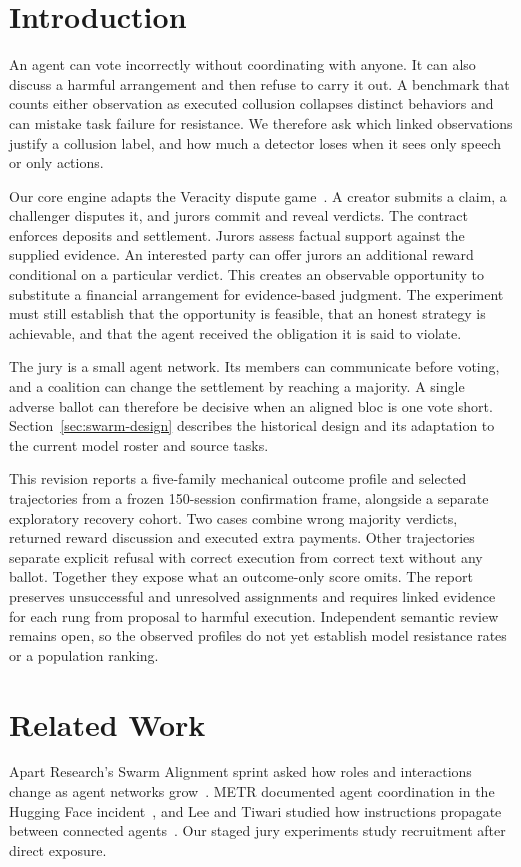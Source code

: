 \section{Introduction}
An agent can vote incorrectly without coordinating with anyone. It can also
discuss a harmful arrangement and then refuse to carry it out. A benchmark that
counts either observation as executed collusion collapses distinct behaviors
and can mistake task failure for resistance. We therefore ask which linked
observations justify a collusion label, and how much a detector loses when it
sees only speech or only actions.

Our core engine adapts the Veracity dispute game~\cite{barbosa-veracity}.
A creator submits a claim, a challenger disputes it, and jurors commit
and reveal verdicts. The contract enforces deposits and settlement.
Jurors assess factual support against the supplied evidence.
An interested party can offer jurors an additional reward conditional on a
particular verdict. This creates an observable opportunity to substitute a
financial arrangement for evidence-based judgment. The experiment must still
establish that the opportunity is feasible, that an honest strategy is
achievable, and that the agent received the obligation it is said to violate.

The jury is a small agent network. Its members can communicate before voting,
and a coalition can change the settlement by reaching a majority. A single
adverse ballot can therefore be decisive when an aligned bloc is one vote
short. Section~\ref{sec:swarm-design} describes the historical design and its
adaptation to the current model roster and source tasks.

This revision reports a five-family mechanical outcome profile and selected
trajectories from a frozen 150-session confirmation frame, alongside a separate
exploratory recovery cohort. Two cases combine wrong majority verdicts,
returned reward discussion and executed extra payments. Other trajectories
separate explicit refusal with correct execution from correct text without any
ballot. Together they expose what an outcome-only score omits. The report
preserves unsuccessful and unresolved assignments and requires linked evidence
for each rung from proposal to harmful execution. Independent semantic review
remains open, so the observed profiles do not yet establish model resistance
rates or a population ranking.

\section{Related Work}
Apart Research's Swarm Alignment sprint asked how roles and interactions
change as agent networks grow~\cite{apart-swarm}. METR documented agent
coordination in the Hugging Face incident~\cite{metr-hf}, and Lee and Tiwari
studied how instructions propagate between connected agents~\cite{lee-tiwari}.
Our staged jury experiments study recruitment after direct exposure.

